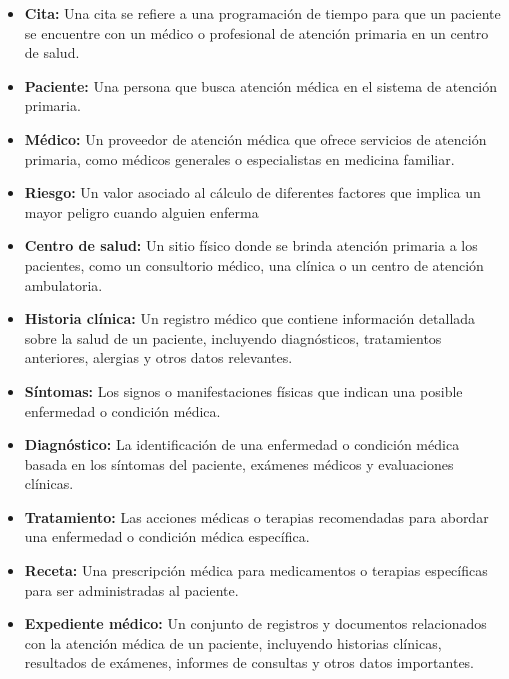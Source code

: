 \begin{itemize}
\item \textbf{Cita:} Una cita se refiere a una programación de tiempo para que un paciente se encuentre con un médico o profesional de atención primaria en un centro de salud.
\item \textbf{Paciente:} Una persona que busca atención médica en el sistema de atención primaria.
\item \textbf{Médico:} Un proveedor de atención médica que ofrece servicios de atención primaria, como médicos generales o especialistas en medicina familiar.
\item \textbf{Riesgo:} Un valor asociado al cálculo de diferentes factores que implica un mayor peligro cuando alguien enferma
\item \textbf{Centro de salud:} Un sitio físico donde se brinda atención primaria a los pacientes, como un consultorio médico, una clínica o un centro de atención ambulatoria.
\item \textbf{Historia clínica:} Un registro médico que contiene información detallada sobre la salud de un paciente, incluyendo diagnósticos, tratamientos anteriores, alergias y otros datos relevantes.
\item \textbf{Síntomas:} Los signos o manifestaciones físicas que indican una posible enfermedad o condición médica.
\item \textbf{Diagnóstico:} La identificación de una enfermedad o condición médica basada en los síntomas del paciente, exámenes médicos y evaluaciones clínicas.
\item \textbf{Tratamiento:} Las acciones médicas o terapias recomendadas para abordar una enfermedad o condición médica específica.
\item \textbf{Receta:} Una prescripción médica para medicamentos o terapias específicas para ser administradas al paciente.
\item \textbf{Expediente médico:} Un conjunto de registros y documentos relacionados con la atención médica de un paciente, incluyendo historias clínicas, resultados de exámenes, informes de consultas y otros datos importantes.
\end{itemize}
